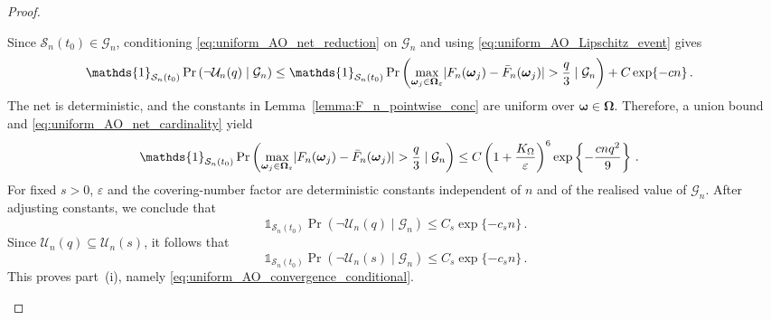 \documentclass{article}
\makeatletter
\theoremstyle{definition}
\newcommand{\abs}[1]{%
	\ensuremath{%
		\if@display
		\left| #1 \right|
		\else
		\lvert #1 \rvert
		\fi
	}%
}
\newcommand*{\bb}{\boldsymbol}
\makeatother
\begin{document}
\begin{bibunit}
\begin{proof}
\begin{enumerate}[label=(\roman*)]
	Since $\mathcal S_n(t_0)\in\mathcal G_n$, conditioning
	\eqref{eq:uniform_AO_net_reduction} on $\mathcal G_n$ and using
	\eqref{eq:uniform_AO_Lipschitz_event} gives
	$$
		\begin{aligned}
		&\mathds{1}_{\mathcal S_n(t_0)}
		\Pr\left(
			\lnot\mathcal U_n(q)
			\mid
			\mathcal G_n
		\right)\leq
		\mathds{1}_{\mathcal S_n(t_0)}
		\Pr\left(
			\underset{\bb\omega_j\in\bb\Omega_\varepsilon}{\max}
			\abs{
			F_n(\bb\omega_j)-\bar F_n(\bb\omega_j)
			}
			>
			\frac{q}{3}
			\mid
			\mathcal G_n
		\right)
		+
		C\exp\{-cn\} \,.
		\end{aligned}
	$$
	The net is deterministic, and the constants in
	Lemma~\ref{lemma:F_n_pointwise_conc} are uniform over
	$\bb\omega\in\bb\Omega$. Therefore, a union bound and
	\eqref{eq:uniform_AO_net_cardinality} yield
	$$
		\begin{aligned}
		&\mathds{1}_{\mathcal S_n(t_0)}
		\Pr\left(
			\underset{\bb\omega_j\in\bb\Omega_\varepsilon}{\max}
			\abs{
			F_n(\bb\omega_j)-\bar F_n(\bb\omega_j)
			}
			>
			\frac{q}{3}
			\mid
			\mathcal G_n
		\right)\leq
		C
		\left(
			1+\frac{K_\Omega}{\varepsilon}
		\right)^6
		\exp\left\{
			-\frac{cnq^2}{9}
		\right\} \,.
		\end{aligned}
	$$
	For fixed $s>0$, $\varepsilon$ and the covering-number factor are
	deterministic constants independent of $n$ and of the realised value
	of $\mathcal G_n$. After adjusting constants, we conclude that
	$$
		\mathds{1}_{\mathcal S_n(t_0)}
		\Pr\left(
			\lnot\mathcal U_n(q)
			\mid
			\mathcal G_n
		\right)
		\leq
		C_s\exp\{-c_sn\}\,.
	$$
	Since $\mathcal U_n(q)\subseteq\mathcal U_n(s)$, it follows that
	$$
		\mathds{1}_{\mathcal S_n(t_0)}
		\Pr\left(
			\lnot\mathcal U_n(s)
			\mid
			\mathcal G_n
		\right)
		\leq
		C_s\exp\{-c_sn\}\,.
	$$
	This proves part~(i), namely
	\eqref{eq:uniform_AO_convergence_conditional}.


\end{enumerate}
\end{proof}
\end{bibunit}
\end{document}
